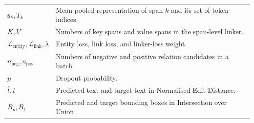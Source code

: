 \begin{longtable}{@{}p{}p{}@{}}
$\mathbf{s}_k, T_k$
  & Mean-pooled representation of span $k$ and its set of token indices. \\
$K, V$
  & Numbers of key spans and value spans in the span-level linker. \\
$\mathcal{L}_{\text{entity}}, \mathcal{L}_{\text{link}}, \lambda$
  & Entity loss, link loss, and linker-loss weight. \\
$n_{\text{neg}}, n_{\text{pos}}$
  & Numbers of negative and positive relation candidates in a batch. \\
$p$
  & Dropout probability. \\
$\hat{t}, t$
  & Predicted text and target text in Normalised Edit Distance. \\
$B_p, B_t$
  & Predicted and target bounding boxes in Intersection over Union. \\ \bottomrule
\end{longtable}
\endgroup
